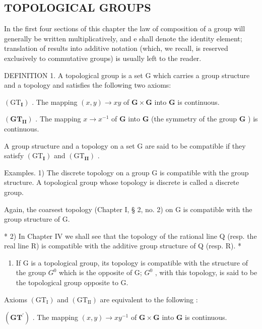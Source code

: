 \subsection{TOPOLOGICAL GROUPS}

In the first four sections of this chapter the law of composition of a group will generally be written multiplicatively, and e shall denote the identity element; translation of results into additive notation (which, we recall, is reserved exclusively to commutative groups) is usually left to the reader.

DEFINITION 1. A topological group is a set G which carries a group structure and a topology and satisfies the following two axioms:

\((\mathrm{GT}_{\mathbf{I}})\) . The mapping \((x, y) \to xy\) of \(\mathbf{G} \times \mathbf{G}\) into \(\mathbf{G}\) is continuous.

\((\mathbf{G}\mathbf{T}_{\mathbf{II}})\) . The mapping \(x \to x^{-1}\) of \(\mathbf{G}\) into \(\mathbf{G}\) (the symmetry of the group \(\mathbf{G}\) ) is continuous.

A group structure and a topology on a set G are said to be compatible if they satisfy \((\mathrm{GT}_{\mathbf{I}})\) and \((\mathrm{GT}_{\mathbf{II}})\) .

Examples. 1) The discrete topology on a group G is compatible with the group structure. A topological group whose topology is discrete is called a discrete group.

Again, the coarsest topology (Chapter I, § 2, no. 2) on G is compatible with the group structure of G.

* 2) In Chapter IV we shall see that the topology of the rational line Q (resp. the real line R) is compatible with the additive group structure of Q (resp. R). *

\begin{enumerate}
\def\labelenumi{\arabic{enumi})}
\setcounter{enumi}{2}
\tightlist
\item
  If G is a topological group, its topology is compatible with the structure of the group \(G^{0}\) which is the opposite of G; \(G^{0}\) , with this topology, is said to be the topological group opposite to G.
\end{enumerate}

Axioms \((\mathrm{GT}_{\mathrm{I}})\) and \((\mathrm{GT}_{\mathrm{II}})\) are equivalent to the following :

\((\mathbf{GT}^{\prime})\) . The mapping \((x,y)\to xy^{-1}\) of \(\mathbf{G}\times \mathbf{G}\) into \(\mathbf{G}\) is continuous.

